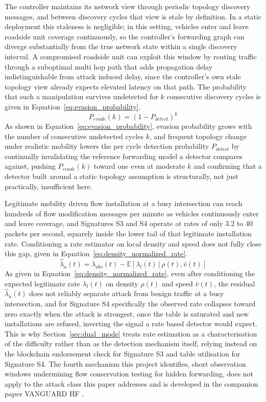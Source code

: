 \documentclass[final,5p,twocolumn]{elsarticle}
\theoremstyle{remark}
\theoremstyle{plain}
\begin{document}
The controller maintains its network view through periodic topology
discovery messages, and between discovery cycles that view is stale by
definition. In a static deployment this staleness is negligible; in this
setting, vehicles enter and leave roadside unit coverage continuously, so
the controller's forwarding graph can diverge substantially from the true
network state within a single discovery interval. A compromised roadside
unit can exploit this window by routing traffic through a suboptimal
multi hop path that adds propagation delay indistinguishable from
attack induced delay, since the controller's own stale topology view
already expects elevated latency on that path. The probability that such
a manipulation survives undetected for $k$ consecutive discovery cycles
is given in Equation~\eqref{eq:evasion_probability}.
\begin{equation}
	P_{evade}(k) = \left(1 - P_{detect}\right)^k
	\label{eq:evasion_probability}
\end{equation}
As shown in Equation~\eqref{eq:evasion_probability}, evasion probability
grows with the number of consecutive undetected cycles $k$, and frequent
topology change under realistic mobility lowers the per cycle detection
probability $P_{detect}$ by continually invalidating the reference
forwarding model a detector compares against, pushing $P_{evade}(k)$
toward one even at moderate $k$ and confirming that a detector built
around a static topology assumption is structurally, not just
practically, insufficient here.

Legitimate mobility driven flow installation at a busy intersection can
reach hundreds of flow modification messages per minute as vehicles
continuously enter and leave coverage, and Signatures S3 and S4 operate
at rates of only 3.2 to 40 packets per second, squarely inside the lower
tail of that legitimate installation rate. Conditioning a rate estimator
on local density and speed does not fully close this gap, given in
Equation~\eqref{eq:density_normalized_rate}.
\begin{equation}
	\hat{\lambda}_a(t) = \lambda_{obs}(t) - \mathbb{E}\!\left[\lambda_l(t)\,|\,\rho(t),\bar{v}(t)\right]
	\label{eq:density_normalized_rate}
\end{equation}
As given in Equation~\eqref{eq:density_normalized_rate}, even after
conditioning the expected legitimate rate $\lambda_l(t)$ on density
$\rho(t)$ and speed $\bar{v}(t)$, the residual $\hat{\lambda}_a(t)$ does
not reliably separate attack from benign traffic at a busy intersection,
and for Signature S4 specifically the observed rate collapses toward zero
exactly when the attack is strongest, once the table is saturated and
new installations are refused, inverting the signal a rate based detector
would expect. This is why Section~\ref{sec:dual_mode} treats rate
estimation as a characterisation of the difficulty rather than as the
detection mechanism itself, relying instead on the blockchain endorsement
check for Signature S3 and table utilisation for Signature S4. The fourth
mechanism this project identifies, short observation windows undermining
flow conservation testing for hidden forwarding, does not apply to the
attack class this paper addresses and is developed in the companion
paper VANGUARD HF \cite{VanguardHF2026}.
\end{document}
